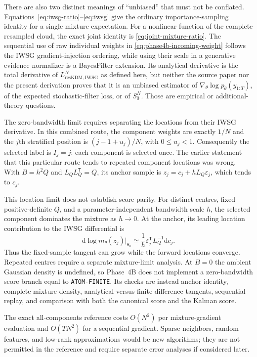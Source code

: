 \documentclass[11pt]{article}
\newcommand{\dd}{\mathrm{d}}
\begin{document}
There are also two distinct meanings of ``unbiased'' that must not be
conflated.  Equations~\eqref{eq:iwsg-ratio}--\eqref{eq:iwsg} give the ordinary
importance-sampling identity for a single mixture expectation.  For a
nonlinear function of the complete resampled cloud, the exact joint identity
is \eqref{eq:joint-mixture-ratio}.  The sequential use of raw individual
weights in \eqref{eq:phase4b-incoming-weight} follows the IWSG
gradient-injection ordering, while using their scale in a generative evidence
normalizer is a BayesFilter extension.  Its analytical derivative is the total
derivative of $L_{\mathrm{resKDM,IWSG}}^N$ as defined here, but neither the
source paper nor the present derivation proves that it is an unbiased estimator of
$\nabla_\theta\log p_\theta(y_{1:T})$, of the expected stochastic-filter loss,
or of $S_0^N$.  Those are empirical or additional-theory questions.

The zero-bandwidth limit requires separating the locations from their IWSG
derivative.  In this combined route, the component weights are exactly $1/N$
and the $j$th stratified position is $(j-1+u_j)/N$, with $0\le u_j<1$.
Consequently the selected label is $I_j=j$: each component is selected once.
The earlier statement that this particular route tends to repeated component
locations was wrong.  With $B=h^2Q$ and $L_QL_Q^\mathsf{T}=Q$, its anchor
sample is $z_j=c_j+hL_Q\varepsilon_j$, which tends to $c_j$.

This location limit does not establish score parity.  For distinct centres,
fixed positive-definite $Q$, and a parameter-independent bandwidth scale $h$,
the selected component dominates the mixture as $h\to0$.  At the anchor,
its leading location contribution to the IWSG differential is
\begin{equation}
 \dd\log m_\theta(z_j)\big|_{\theta_0}
 \simeq \frac{1}{h}\varepsilon_j^\mathsf{T}L_Q^{-1}\dd c_j.
 \label{eq:phase4b-small-bandwidth-tangent}
\end{equation}
Thus the fixed-sample tangent can grow while the forward locations converge.
Repeated centres require a separate mixture-limit analysis.  At $B=0$ the
ambient Gaussian density is undefined, so Phase~4B does not implement a
zero-bandwidth score branch equal to \texttt{ATOM-FINITE}.  Its checks are instead anchor
identity, complete-mixture density, analytical-versus-finite-difference
tangents, sequential replay, and comparison with both the canonical score and
the Kalman score.

The exact all-components reference costs $O(N^2)$ per mixture-gradient
evaluation and $O(TN^2)$ for a sequential gradient.  Sparse neighbors, random
features, and low-rank approximations would be new algorithms; they are not
permitted in the reference and require separate error analyses if considered
later.
\end{document}
